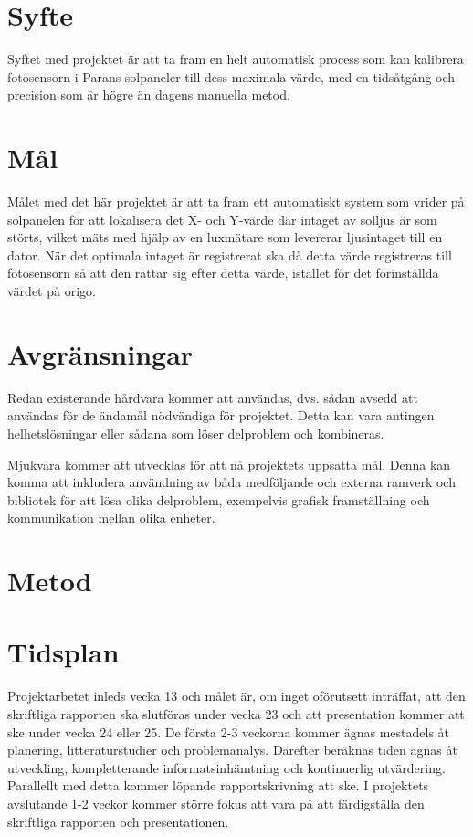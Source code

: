 \documentclass{article}
\begin{document}


\section{Syfte} %
\label{sec:syfte}
    Syftet med projektet är att ta fram en helt automatisk process som kan kalibrera fotosensorn i Parans solpaneler till dess maximala värde, med en tidsåtgång och precision som är högre än dagens manuella metod.


\section{Mål} %
\label{sec:m_l}

    Målet med det här projektet är att ta fram ett automatiskt system som vrider på solpanelen för att lokalisera det X- och Y-värde där intaget av solljus är som störts, vilket mäts med hjälp av en luxmätare som levererar ljusintaget till en dator. När det optimala intaget är registrerat ska då detta värde registreras till fotosensorn så att den rättar sig efter detta värde, istället för det förinställda värdet på origo. 


\section{Avgränsningar} %
\label{sec:avgr_nsningar}
    Redan existerande hårdvara kommer att användas, dvs. sådan avsedd att användas för de ändamål nödvändiga för projektet. Detta kan vara antingen helhetslösningar eller sådana som löser delproblem och kombineras. \bigskip

    Mjukvara kommer att utvecklas för att nå projektets uppsatta mål. Denna kan komma att inkludera användning av båda medföljande och externa ramverk och bibliotek för att lösa olika delproblem, exempelvis grafisk framställning och kommunikation mellan olika enheter.


\section{Metod}
\label{sec:metod} %


\section{Tidsplan}
\label{sec:tidsplan} %
    Projektarbetet inleds vecka 13 och målet är, om inget oförutsett inträffat, att den skriftliga rapporten ska slutföras under vecka 23 och att presentation kommer att ske under vecka 24 eller 25. De första 2-3 veckorna kommer ägnas mestadels åt planering, litteraturstudier och problemanalys. Därefter beräknas tiden ägnas åt utveckling, kompletterande informatsinhämtning och kontinuerlig utvärdering. Parallellt med detta kommer löpande rapportskrivning att ske. I projektets avslutande 1-2 veckor kommer större fokus att vara på att färdigställa den skriftliga rapporten och presentationen. \bigskip
\end{document}
